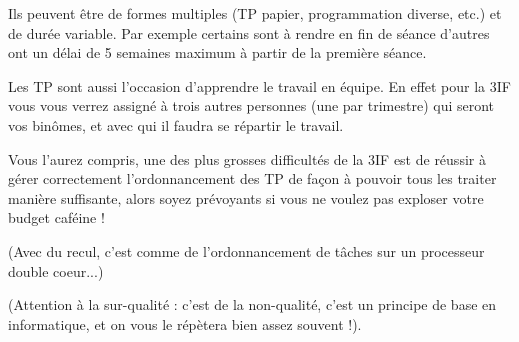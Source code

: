 Ils peuvent être de formes multiples (TP papier, programmation diverse, etc.)
    et de durée variable. Par exemple certains sont à rendre en fin de séance
    d'autres ont un délai de 5 semaines maximum à partir de la première séance.
    

Les TP sont aussi l'occasion d'apprendre le travail en équipe. En effet pour la
3IF vous vous verrez assigné à trois autres personnes (une par trimestre) qui
seront vos binômes, et avec qui il faudra se répartir le travail.

Vous l'aurez compris, une des plus grosses difficultés de la 3IF est de réussir
à gérer correctement l'ordonnancement des TP de façon à pouvoir tous les
traiter manière suffisante, alors soyez prévoyants  si vous ne voulez pas
exploser votre budget caféine !  

(Avec du recul, c'est comme de l'ordonnancement de tâches sur un processeur
 double coeur...) 

(Attention à la sur-qualité : c'est de la non-qualité, c'est un principe de
 base en informatique, et on vous le répètera bien assez souvent !).

